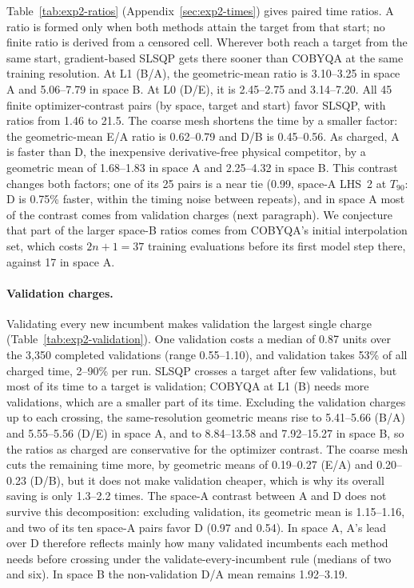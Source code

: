 Table~\ref{tab:exp2-ratios} (Appendix~\ref{sec:exp2-times}) gives paired time ratios. A ratio is formed
only when both methods attain the target from that start; no finite ratio
is derived from a censored cell. Wherever both reach a target from the
same start, gradient-based SLSQP gets there sooner than COBYQA at the same
training resolution. At L1 (B/A), the geometric-mean ratio is 3.10--3.25 in
space A and 5.06--7.79 in space B. At L0 (D/E), it is 2.45--2.75 and
3.14--7.20.
All 45 finite optimizer-contrast pairs (by space, target and start) favor
SLSQP, with ratios from 1.46 to 21.5. The coarse mesh shortens the time by
a smaller factor: the geometric-mean E/A ratio is 0.62--0.79 and D/B is
0.45--0.56. As charged, A is faster than D, the inexpensive derivative-free
physical competitor, by a geometric mean of 1.68--1.83 in space A and
2.25--4.32 in space B. This contrast changes both factors; one of its 25
pairs is a near tie (0.99, space-A LHS~2 at $T_{90}$: D is 0.75\% faster,
within the timing noise between repeats), and in space A most of the
contrast comes from validation charges (next paragraph). We conjecture that part of the larger
space-B ratios comes from COBYQA's initial interpolation set, which costs
$2n+1=37$ training evaluations before its first model step there, against
17 in space A.

\paragraph{Validation charges.}
Validating every new incumbent makes validation the largest single
charge (Table~\ref{tab:exp2-validation}). One validation costs a median of
0.87 units over the 3,350 completed validations (range 0.55--1.10), and
validation takes 53\% of all charged time, 2--90\% per run. SLSQP crosses
a target after few validations, but most of its time to a target is
validation; COBYQA at L1 (B) needs more validations, which are a smaller
part of its time. Excluding the validation charges up to each crossing, the
same-resolution geometric means rise to 5.41--5.66 (B/A) and 5.55--5.56
(D/E) in space A, and to 8.84--13.58 and 7.92--15.27 in space B, so the
ratios as charged are conservative for the optimizer contrast. The coarse
mesh cuts the remaining time more, by geometric means of 0.19--0.27 (E/A)
and 0.20--0.23 (D/B), but it does not make validation cheaper, which is why
its overall saving is only 1.3--2.2 times. The space-A contrast between A
and D does not survive this decomposition: excluding validation, its
geometric mean is 1.15--1.16, and two of its ten space-A pairs favor D
(0.97 and 0.54). In space A, A's lead over D therefore reflects mainly how
many validated incumbents each method needs before crossing under the
validate-every-incumbent rule (medians of two and six). In space B the
non-validation D/A mean remains 1.92--3.19.

